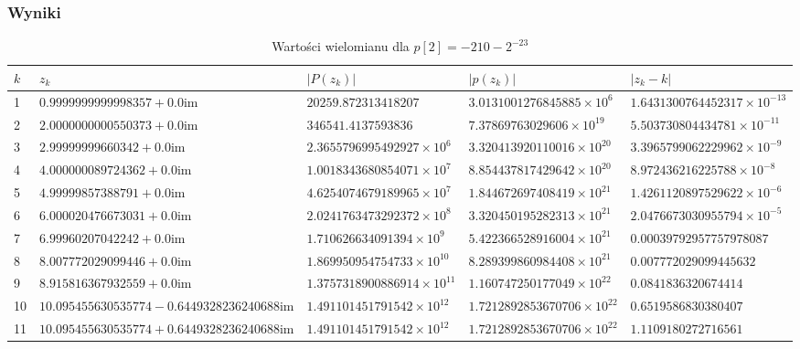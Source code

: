 \documentclass[10pt,a4paper, polish]{article}
\begin{document}
\subsubsection*{Wyniki}
\begin{table}[H]
\centering
\caption{Wartości wielomianu dla $p[2] = -210-2^{-23}$}
\begin{tabular}{|p{0.1cm}|p{3.2cm}|p{3.2cm}|p{3.2cm}|p{3.2cm}|}
\hline
$k$ & $z_k$ & $|P(z_k)|$ & $|p(z_k)|$ & $|z_k - k|$ \\
\hline
1 & $0.9999999999998357 + 0.0\text{im}$ & $20259.872313418207$ & $3.0131001276845885\times 10^6$ & $1.6431300764452317\times 10^{-13}$ \\
\hline
2 & $2.0000000000550373 + 0.0\text{im}$ & $346541.4137593836$ & $7.37869763029606\times 10^{19}$ & $5.503730804434781\times 10^{-11}$ \\
\hline
3 & $2.99999999660342 + 0.0\text{im}$ & $2.3655796995492927\times 10^{6}$ & $3.320413920110016\times 10^{20}$ & $3.3965799062229962\times 10^{-9}$ \\
\hline
4 & $4.000000089724362 + 0.0\text{im}$ & $1.0018343680854071\times 10^{7}$ & $8.854437817429642\times 10^{20}$ & $8.972436216225788\times 10^{-8}$ \\
\hline
5 & $4.99999857388791 + 0.0\text{im}$ & $4.6254074679189965\times 10^{7}$ & $1.844672697408419\times 10^{21}$ & $1.4261120897529622\times 10^{-6}$ \\
\hline
6 & $6.000020476673031 + 0.0\text{im}$ & $2.0241763473292372\times 10^{8}$ & $3.320450195282313\times 10^{21}$ & $2.0476673030955794\times 10^{-5}$ \\
\hline
7 & $6.99960207042242 + 0.0\text{im}$ & $1.710626634091394\times 10^{9}$ & $5.422366528916004\times 10^{21}$ & $0.00039792957757978087$ \\
\hline
8 & $8.007772029099446 + 0.0\text{im}$ & $1.869950954754733\times 10^{10}$ & $8.289399860984408\times 10^{21}$ & $0.007772029099445632$ \\
\hline
9 & $8.915816367932559 + 0.0\text{im}$ & $1.3757318900886914\times 10^{11}$ & $1.160747250177049\times 10^{22}$ & $0.0841836320674414$ \\
\hline
10 & $10.095455630535774 - 0.6449328236240688\text{im}$ & $1.491101451791542\times 10^{12}$ & $1.7212892853670706\times 10^{22}$ & $0.6519586830380407$ \\
\hline
11 & $10.095455630535774 + 0.6449328236240688\text{im}$ & $1.491101451791542\times 10^{12}$ & $1.7212892853670706\times 10^{22}$ & $1.1109180272716561$ \\

\end{tabular}
\end{table}
\end{document}
